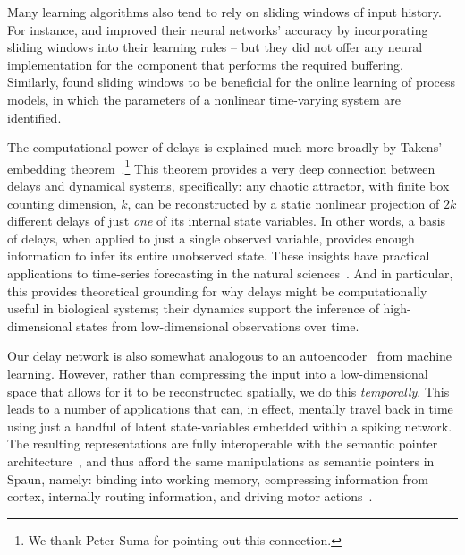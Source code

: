 Many learning algorithms also tend to rely on sliding windows of input history.
For instance, \citet{leng2013online} and \citet{izzeldin2011online} improved their neural networks' accuracy by incorporating sliding windows into their learning rules -- but they did not offer any neural implementation for the component that performs the required buffering.
Similarly, \citet{ferreira2009online} found sliding windows to be beneficial for the online learning of process models, in which the parameters of a nonlinear time-varying system are identified.

The computational power of delays is explained much more broadly by Takens' embedding theorem~\citep{takens1981detecting, noakes1991takens}.\footnote{%
We thank Peter Suma for pointing out this connection.
}
This theorem provides a very deep connection between delays and dynamical systems, specifically: any chaotic attractor, with finite box counting dimension, $k$, can be reconstructed by a static nonlinear projection of $2k$ different delays of just \emph{one} of its internal state variables.
In other words, a basis of delays, when applied to just a single observed variable, provides enough information to infer its entire unobserved state.
These insights have practical applications to time-series forecasting in the natural sciences~\citep{sugihara2012detecting}.
And in particular, this provides theoretical grounding for why delays might be computationally useful in biological systems; their dynamics support the inference of high-dimensional states from low-dimensional observations over time.

Our delay network is also somewhat analogous to an autoencoder~\citep{gulli2017deep} from machine learning.
However, rather than compressing the input into a low-dimensional space that allows for it to be reconstructed spatially, we do this \emph{temporally}.
This leads to a number of applications that can, in effect, mentally travel back in time using just a handful of latent state-variables embedded within a spiking network.
The resulting representations are fully interoperable with the semantic pointer architecture~\citep[SPA;][]{eliasmith2012}, and thus afford the same manipulations as semantic pointers in Spaun, namely: binding into working memory, compressing information from cortex, internally routing information, and driving motor actions~\citep{eliasmith2013build}.

